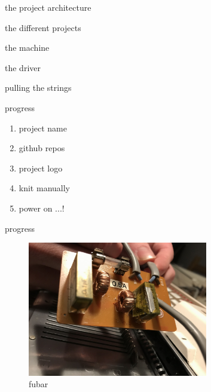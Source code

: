 \begin{frame}{the project architecture}
    \begin{figure}
    \end{figure}
\end{frame}


\begin{frame}{the different projects}
    \begin{description}[<+->]
        \item [knitt] the machine
        \item [michael] the driver
        \item [devon] pulling the strings
    \end{description}
\end{frame}


\begin{frame}{progress}
    \begin{enumerate}
        \item project name \pause \emojiCheck \pause
        \item github repos \pause \emojiCheck \pause
        \item project logo \pause \emojiCheck \pause
        \item knit manually \pause \emojiCheck \pause
        \item power on ...! \pause
    \end{enumerate}

    \center
     \pause %
     \pause %
     \pause %
     \pause %
\end{frame}

\begin{frame}{progress}
    \begin{figure}
        \includegraphics[width=0.7\textwidth]{./images/exploded-capacitor.png}
        \caption{fubar}
    \end{figure}
\end{frame}

